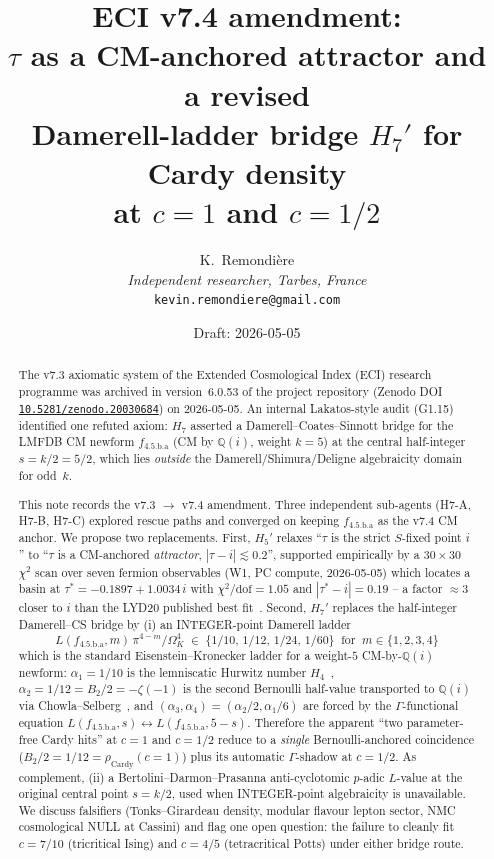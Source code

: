 \documentclass[a4paper,11pt]{article}
\title{ECI v7.4 amendment:\\
       $\tau$ as a CM-anchored attractor and a revised\\
       Damerell-ladder bridge $H_7'$ for Cardy density\\
       at $c=1$ and $c=1/2$}
\author{%
  K.~Remondi\`ere%
  \\[2ex]
  \small\textit{Independent researcher, Tarbes, France}\\
  \small\texttt{kevin.remondiere@gmail.com}
}
\date{Draft: 2026-05-05}
\newcommand{\OmK}{\Omega_K}
\newcommand{\fLM}{f_{\text{4.5.b.a}}}
\newcommand{\Qi}{\mathbb{Q}(i)}
\newcommand{\Zeno}{\href{https://doi.org/10.5281/zenodo.20030684}{\texttt{10.5281/zenodo.20030684}}}
\theoremstyle{definition}
\theoremstyle{remark}
\begin{document}
\maketitle

\begin{abstract}
The v7.3 axiomatic system of the Extended Cosmological Index (ECI)
research programme was archived in version~6.0.53 of the project
repository (Zenodo DOI \Zeno) on 2026-05-05.  An internal Lakatos-style
audit (G1.15) identified one refuted axiom: $H_7$ asserted a
Damerell--Coates--Sinnott bridge for the LMFDB CM newform
$\fLM$ (CM by $\Qi$, weight $k=5$) at the central
half-integer $s=k/2=5/2$, which lies \emph{outside} the
Damerell/Shimura/Deligne algebraicity domain for odd~$k$.
\par
This note records the v7.3 $\to$ v7.4 amendment.  Three independent
sub-agents (H7-A, H7-B, H7-C) explored rescue paths and converged on
keeping $\fLM$ as the v7.4 CM anchor.  We propose two replacements.
First, $H_5'$ relaxes ``$\tau$ is the strict $S$-fixed point $i$'' to
``$\tau$ is a CM-anchored \emph{attractor}, $|\tau-i|\lesssim 0.2$'',
supported empirically by a $30\times 30$ $\chi^2$ scan over seven
fermion observables (W1, PC compute, 2026-05-05) which locates a basin
at $\tau^{*} = -0.1897 + 1.0034\,i$ with $\chi^2/\mathrm{dof}=1.05$ and
$|\tau^{*}-i|=0.19$ -- a factor $\approx\!3$ closer to $i$ than the
LYD20 published best fit~\cite{LYD20}.  Second, $H_7'$ replaces the
half-integer Damerell--CS bridge by (i) an INTEGER-point Damerell
ladder
\[
\boxed{\;\;L(\fLM, m)\,\pi^{4-m}/\OmK^{4} \;\in\; \{1/10,\,1/12,\,1/24,\,1/60\}
       \;\;\text{for}\;\; m\in\{1,2,3,4\}\;\;}
\]
which is the standard Eisenstein--Kronecker ladder for a weight-$5$
CM-by-$\Qi$ newform: $\alpha_1 = 1/10$ is the lemniscatic Hurwitz
number $H_4$~\cite{Hurwitz1899,HS86}, $\alpha_2 = 1/12 = B_2/2 =
-\zeta(-1)$ is the second Bernoulli half-value transported to $\Qi$
via Chowla--Selberg~\cite{ChowSel49,Damerell71,Shimura76}, and
$(\alpha_3,\alpha_4) = (\alpha_2/2, \alpha_1/6)$ are forced by the
$\Gamma$-functional equation $L(\fLM,s) \leftrightarrow L(\fLM,5-s)$.
Therefore the apparent ``two parameter-free Cardy hits'' at $c=1$ and
$c=1/2$ reduce to a \emph{single} Bernoulli-anchored coincidence
($B_2/2 = 1/12 = \rho_{\mathrm{Cardy}}(c=1)$) plus its automatic
$\Gamma$-shadow at $c=1/2$.  As complement, (ii) a
Bertolini--Darmon--Prasanna anti-cyclotomic $p$-adic $L$-value at the
original central point $s=k/2$, used when INTEGER-point algebraicity
is unavailable.
We discuss falsifiers (Tonks--Girardeau density, modular flavour
lepton sector, NMC cosmological NULL at Cassini) and flag one open
question: the failure to cleanly fit $c=7/10$ (tricritical Ising) and
$c=4/5$ (tetracritical Potts) under either bridge route.
\end{abstract}
\end{document}
